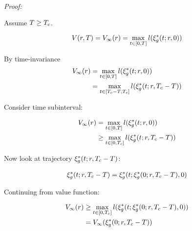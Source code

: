 \textit{Proof:}

Assume $T \ge T_c$.

\begin{equation}
\begin{aligned}
V(r, T) &= V_\infty(r) = \max_{t \in [0, T]} l(\xi_g^*(t; r, 0))\\
\end{aligned}
\end{equation}

By time-invariance
 \begin{equation}
 \begin{aligned}
 V_\infty(r) &= \max_{t \in [0, T]} l(\xi_g^*(t; r, 0)) \\
 &= \max_{t \in [T_c-T, T_c]} l(\xi_g^*(t; r, T_c-T)) \\
 \end{aligned}
 \end{equation}  
 
Consider time subinterval:
 
 \begin{equation}
\begin{aligned}
V_\infty(r) &= \max_{t \in [0, T]} l(\xi_g^*(t; r, 0)) \\
&\ge \max_{t \in [0, T_c]} l(\xi_g^*(t; r, T_c-T)) \\
\end{aligned}
\end{equation}  

Now look at trajectory $\xi_g^*(t; r, T_c-T)$:

\begin{equation}
\begin{aligned}
\xi_g^*(t; r, T_c-T) = \xi_g^*(t; \xi_g^*(0; r, T_c-T), 0)
\end{aligned}
\end{equation}

Continuing from value function:

\begin{equation}
\begin{aligned}
V_\infty(r) &\ge \max_{t \in [0, T_c]} l(\xi_g^*(t; \xi_g^*(0; r, T_c-T), 0)) \\
&= V_\infty(\xi_g^*(0; r, T_c-T))
\end{aligned}
\end{equation} 
 
